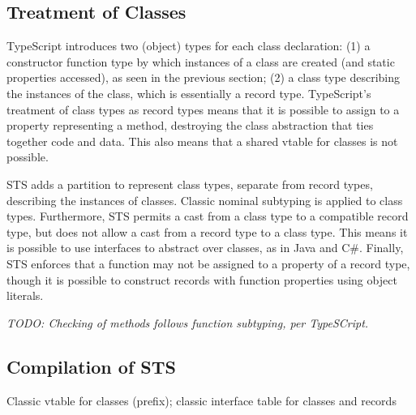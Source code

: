 \subsection{Treatment of Classes}

TypeScript introduces two (object) types for each class declaration: 
(1) a constructor function type by which instances of a class
are created (and static properties accessed), as seen in the previous section; 
(2) a class type describing the instances of the class, which is essentially a record type. 
TypeScript's treatment of class types as record types
means that it is possible to assign to a property representing a method, 
destroying the class abstraction that ties together code and data. This also means
that a shared vtable for classes is not possible. 

STS adds a partition to represent class types, separate from record types, describing the instances of classes.
Classic nominal subtyping is applied to class types. Furthermore, STS permits a cast from a class type
to a compatible record type, but does not allow a cast from a record type to a class type. This means
it is possible to use interfaces to abstract over classes, as in Java and C\#. 
Finally, STS enforces that a function may not
be assigned to a property of a record type, 
though it is possible to construct records with function properties using object literals. 

\emph{TODO: Checking of methods follows function subtyping, per TypeSCript.}





\subsection{Compilation of STS}


Classic vtable for classes (prefix); classic interface table for classes and records
